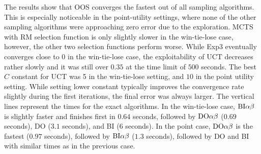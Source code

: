 The results show that OOS converges the fastest out of all sampling algorithms.
This is especially noticeable in the point-utility settings, where none of the other sampling algorithms were approaching zero error due to the exploration.
MCTS with RM selection function is only slightly slower in the win-tie-lose case, however, the other two selection functions perform worse.
While Exp3 eventually converges close to $0$ in the win-tie-lose case, the exploitability of UCT decreases rather slowly and it was still over $0.35$ at the time limit of $500$ seconds.
The best $C$ constant for UCT was 5 in the win-tie-lose setting, and $10$ in the point utility setting.
While setting lower constant typically improves the convergence rate slightly during the first iterations, the final error was always larger.
The vertical lines represent the times for the exact algorithms.
In the win-tie-lose case, $\textrm{BI}\alpha\beta$ is slightly faster and finishes first in $0.64$ seconds, followed by $\textrm{DO}\alpha\beta$ ($0.69$ seconds), \textsc{DO} ($3.1$ seconds), and \textsc{BI} ($6$ seconds).
In the point case, $\textrm{DO}\alpha\beta$ is the fastest ($0.97$ seconds), followed by $\textrm{BI}\alpha\beta$ ($1.3$ seconds), followed by \textsc{DO} and \textsc{BI} with similar times as in the previous case.

